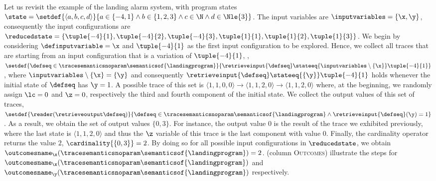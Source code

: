\begin{example}
  \newcommand*{\inputa}{\tuple{-4}{1}} \newcommand*{\outputa}{\langle \outputvaluea\rangle} \newcommand*{\outputvaluea}{3}
  \newcommand*{\inputb}{\tuple{-4}{2}} \newcommand*{\outputb}{\langle \outputvalueb\rangle} \newcommand*{\outputvalueb}{3}
  \newcommand*{\inputc}{\tuple{-4}{3}} \newcommand*{\outputc}{\langle \outputvaluec\rangle} \newcommand*{\outputvaluec}{3}
  \newcommand*{\inputd}{\tuple{ 1}{1}} \newcommand*{\outputd}{\langle \outputvalued\rangle} \newcommand*{\outputvalued}{0}
  \newcommand*{\inpute}{\tuple{ 1}{2}} \newcommand*{\outpute}{\langle \outputvaluee\rangle} \newcommand*{\outputvaluee}{1}
  \newcommand*{\inputf}{\tuple{ 1}{3}} \newcommand*{\outputf}{\langle \outputvaluef\rangle} \newcommand*{\outputvaluef}{2}
  \newcommand*{\tracea}{\inputa\to\outputa}
  \newcommand*{\traceb}{\inputb\to\outputb}
  \newcommand*{\tracec}{\inputc\to\outputc}
  \newcommand*{\traced}{\inputd\to\outputd}
  \newcommand*{\tracee}{\inpute\to\outpute}
  \newcommand*{\tracef}{\inputf\to\outputf}
  Let us revisit the example of the landing alarm system, with program states $\state=\setdef{\langle a, b, c, d \rangle}{a\in\{-4,1\}\land b\in\{1,2,3\}\land c\in\N \land d\in\Nle{3}}$.
  The input variables are $\inputvariables = \{\x,\y\}$, consequently the input configurations are
  $\reducedstate=\{\inputa, \inputb, \inputc, \inputd, \inpute, \inputf\}$.
%
  We begin by considering $\definputvariable=\x$ and $\inputa$ as the first input configuration to be explored.
  Hence, we collect all traces that are
  starting from an input configuration that is a variation of $\inputa$, \ie, $\setdef{
    \defseq \in \tracesemanticsnoparam\semanticsof{\landingprogram}
  }{
    \retrieveinput{\defseq} \stateeq{\inputvariables\setminus\{\x\}} \inputa
  }$, where $\inputvariables\setminus\{\x\} = \{\y\}$ and consequently $\retrieveinput{\defseq} \stateeq{\{\y\}} \inputa$ holds whenever the initial state of $\defseq$ has $\y=1$. A possible trace of this set is $\langle 1, 1, 0, 0\rangle \to \langle 1, 1, 2, 0\rangle\to\langle 1, 1, 2, 0\rangle$ where, at the beginning, we randomly assign $\lc=0$ and $\z=0$, respectively the third and fourth component of the initial state.
%
  We collect the output values of this set of traces, $\setdef{
    \reader(\retrieveoutput\defseq)
  }{
    \defseq \in \tracesemanticsnoparam\semanticsof{\landingprogram} \land
      \retrieveinput{\defseq}(\y) = 1
  }$.
  As a result, we obtain the set of output values $\{0, 3\}$.
  For instance, the output value $0$ is the result of the trace we exhibited previously, where the last state is $\langle 1, 1, 2, 0\rangle$ and thus the $\z$ variable of this trace is the last component with value $0$.
%
  Finally, the cardinality operator returns the value $2$, $\cardinality{\{0, 3\}} = 2$.
  By doing so for all possible input configurations in $\reducedstate$, we obtain $\outcomesname_{\x}(\tracesemanticsnoparam\semanticsof{\landingprogram})=2$.
   (column \textsc{Outcomes}) illustrate the steps for $\outcomesname_{\x}(\tracesemanticsnoparam\semanticsof{\landingprogram})$ and $\outcomesname_{\y}(\tracesemanticsnoparam\semanticsof{\landingprogram})$ respectively.
\end{example}

